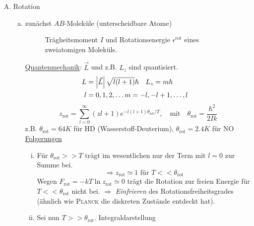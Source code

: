 \begin{enumerate}[A)]
    \item Rotation
    \begin{enumerate}[a)]
        \item zunächst $AB$-Moleküle (unterscheidbare Atome)
        
        \begin{figure}[H]
        \centering
        \def\svgwidth{0.7\textwidth}
        
        \caption{Trägheitsmoment $I$ und Rotationsenergie $\epsilon^{\text{rot}}$ eines zweiatomigen Moleküls.}
        \label{img:2atomicMoleculeInertia}
        \end{figure}
       
        \underline{Quantenmechanik}: $\vec{L}$ und z.B. $L_z$ sind quantisiert.
        \begin{equation}
            \begin{split}
                L &= \left| \vec{L} \right| \sqrt{l(l+1)} \hbar \quad L_z = m \hbar  \\
                l &= 0, 1, 2, \ldots m = -l, -l+1, \ldots, l &
            \end{split}
        \end{equation}
        \begin{equation}
            z_\text{rot} = \sum_{l=0}^{\infty} (zl + 1) e^{-l(l+1) \theta_\text{rot} / T}, \quad \text{mit} \quad \theta_\text{rot} = \frac{\hbar^2}{2 I k}
        \end{equation}
        z.B. $\theta_\text{rot} = 64K$ für HD (Wasserstoff-Deuterium), $\theta_\text{rot} = 2.4K$ für NO \\
        \underline{Folgerungen}
        \begin{enumerate}[i)]
            \item Für $\theta_\text{rot} >> T$ trägt im wesentlichen nur der Term mit $l=0$ zur Summe bei.
            \begin{equation}
                \Rightarrow z_\text{rot} \simeq 1 \text{ für } T << \theta_\text{rot}
            \end{equation}
            Wegen $F_\text{rot} = - k T \ln z_\text{rot} \simeq 0$ trägt die Rotation zur freien Energie für $T << \theta_\text{rot}$ nicht bei.
            $\Rightarrow$ \emph{Einfrieren} des Rotationsfreiheitsgrades (ähnlich wie \textsc{Planck} die diskreten Zustände entdeckt hat).
            \item Sei nun $T >> \theta_\text{rot}$. Integraldarstellung
            \begin{equation}

\end{equation}
\end{enumerate}
\end{enumerate}
\end{enumerate}
